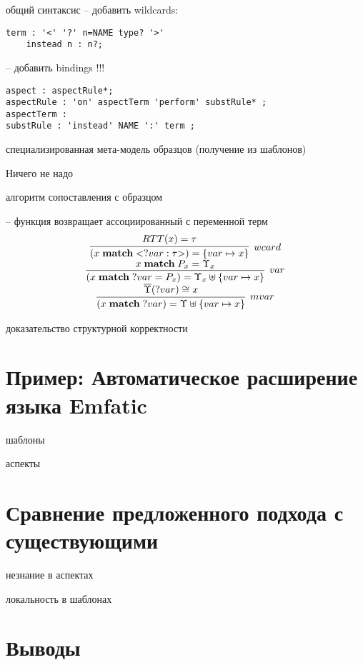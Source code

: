 общий синтаксис
 -- добавить wildcards:
\begin{lstlisting}
term : '<' '?' n=NAME type? '>'
	instead n : n?;
\end{lstlisting}

 -- добавить bindings !!! 
\begin{lstlisting}
aspect : aspectRule*;
aspectRule : 'on' aspectTerm 'perform' substRule* ;
aspectTerm : 
substRule : 'instead' NAME ':' term ;
\end{lstlisting}

специализированная мета-модель образцов (получение из шаблонов)

   Ничего не надо

алгоритм сопоставления с образцом

-- функция возвращает ассоциированный с переменной терм
$$
\begin{array}{c}
\infer[wcard]{
	(\match{x}{\wcard{?var}{\tau}}) = \meitem{var}{x}
}{RTT(x) = \tau}
\\
\infer[var]{
	(\match{x}{?var = P_x}) = \ME_x \mejoin \meitem{var}{x}
}{
\match{x}{P_x} = \ME_x
}
\\
\infer[mvar]{
	(\match{x}{?var}) = \ME \mejoin \meitem{var}{x}
}{
\meflatten{\ME}(?var) \cong x
}
\end{array}
$$
	

доказательство структурной корректности

\chapter{Пример: Автоматическое расширение языка Emfatic}

шаблоны

аспекты

\chapter{Сравнение предложенного подхода с существующими}

незнание в аспектах

локальность в шаблонах

\chapter{Выводы}
